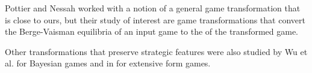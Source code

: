 Pottier and Nessah \cite{BergeVaismanEq} worked with a notion of a general game transformation that is close to ours, but their study of interest are game transformations that convert the Berge-Vaisman equilibria of an input game to the \NEs{} of the transformed game. 

Other transformations that preserve strategic features were also studied by Wu et al. \cite{9585431} for Bayesian games and in \cite{RM-759-PR, 10.2307/1912320, ELMES19941, CASAJUS2003267} for extensive form games.
